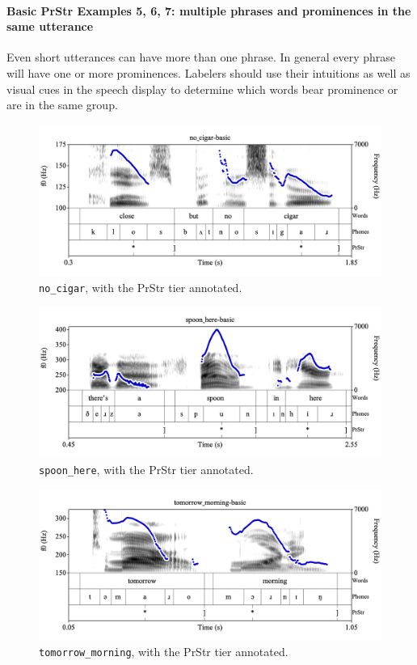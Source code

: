 \documentclass[11pt, twoside]{memoir}
\begin{document}
\paragraph{Basic PrStr Examples 5, 6, 7: multiple phrases and prominences in the same utterance}
Even short utterances can have more than one phrase. In general every phrase will have one or more prominences.  Labelers should use their intuitions as well as visual cues in the speech display to determine which words bear prominence or are in the same group.
\begin{figure}[H]
\centering
\includegraphics[width=.875\linewidth]{PrStr-no_cigar-basic.png}
\caption{\texttt{no\_cigar}, with the PrStr tier annotated.
\label{fig:no_cigar PrStr}
}
\end{figure}
\begin{figure}[H]
\centering
\includegraphics[width=.875\linewidth]{PrStr-spoon_here-basic.png}
\caption{\texttt{spoon\_here}, with the PrStr tier annotated.
\label{fig:spoon_here PrStr}
}
\end{figure}
\begin{figure}[H]
\centering
\includegraphics[width=.875\linewidth]{PrStr-tomorrow_morning-basic.png}
\caption{\texttt{tomorrow\_morning}, with the PrStr tier annotated.
\label{fig:tomorrow_morning PrStr}
}
\end{figure}
\end{document}
